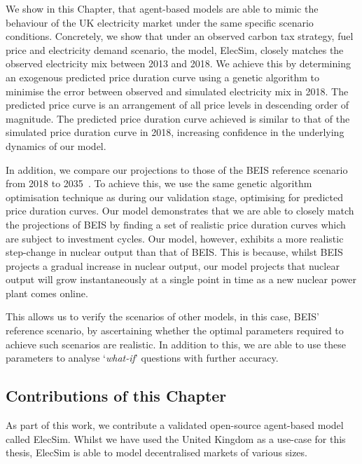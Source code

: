 
We show in this Chapter, that agent-based models are able to mimic the behaviour of the UK electricity market under the same specific scenario conditions. Concretely, we show that under an observed carbon tax strategy, fuel price and electricity demand scenario, the model, ElecSim, closely matches the observed electricity mix between 2013 and 2018. We achieve this by determining an exogenous predicted price duration curve using a genetic algorithm to minimise the error between observed and simulated electricity mix in 2018. The predicted price curve is an arrangement of all price levels in descending order of magnitude. The predicted price duration curve achieved is similar to that of the simulated price duration curve in 2018, increasing confidence in the underlying dynamics of our model. 

In addition, we compare our projections to those of the BEIS reference scenario from 2018 to 2035~\cite{DBEIS2019}. To achieve this, we use the same genetic algorithm optimisation technique as during our validation stage, optimising for predicted price duration curves. Our model demonstrates that we are able to closely match the projections of BEIS by finding a set of realistic price duration curves which are subject to investment cycles. Our model, however, exhibits a more realistic step-change in nuclear output than that of BEIS. This is because, whilst BEIS projects a gradual increase in nuclear output, our model projects that nuclear output will grow instantaneously at a single point in time as a new nuclear power plant comes online. 

This allows us to verify the scenarios of other models, in this case, BEIS' reference scenario, by ascertaining whether the optimal parameters required to achieve such scenarios are realistic. In addition to this, we are able to use these parameters to analyse `\textit{what-if}' questions with further accuracy.


\subsection{Contributions of this Chapter}

As part of this work, we contribute a validated open-source agent-based model called ElecSim. Whilst we have used the United Kingdom as a use-case for this thesis, ElecSim is able to model decentralised markets of various sizes. 

